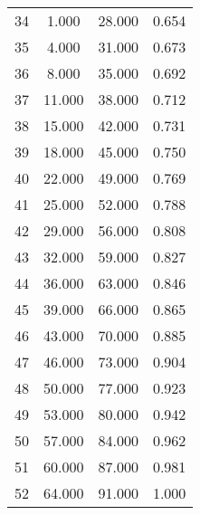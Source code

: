 \begin{tabular}{cccc}
  34 & 1.000 & 28.000 & 0.654 \\ 
  35 & 4.000 & 31.000 & 0.673 \\ 
  36 & 8.000 & 35.000 & 0.692 \\ 
  37 & 11.000 & 38.000 & 0.712 \\ 
  38 & 15.000 & 42.000 & 0.731 \\ 
  39 & 18.000 & 45.000 & 0.750 \\ 
  40 & 22.000 & 49.000 & 0.769 \\ 
  41 & 25.000 & 52.000 & 0.788 \\ 
  42 & 29.000 & 56.000 & 0.808 \\ 
  43 & 32.000 & 59.000 & 0.827 \\ 
  44 & 36.000 & 63.000 & 0.846 \\ 
  45 & 39.000 & 66.000 & 0.865 \\ 
  46 & 43.000 & 70.000 & 0.885 \\ 
  47 & 46.000 & 73.000 & 0.904 \\ 
  48 & 50.000 & 77.000 & 0.923 \\ 
  49 & 53.000 & 80.000 & 0.942 \\ 
  50 & 57.000 & 84.000 & 0.962 \\ 
  51 & 60.000 & 87.000 & 0.981 \\ 
  52 & 64.000 & 91.000 & 1.000 \\ 
   \hline
\end{tabular}
